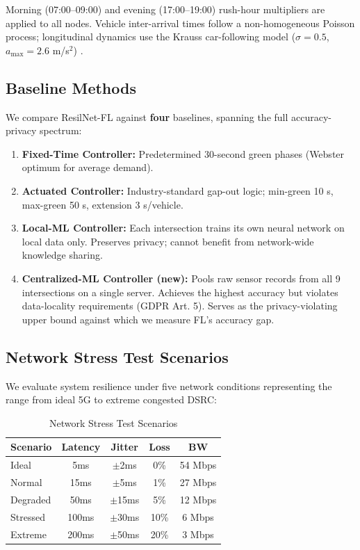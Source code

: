 \documentclass[conference]{IEEEtran}
\begin{document}
Morning (07:00--09:00) and evening (17:00--19:00) rush-hour multipliers are applied to all nodes. Vehicle inter-arrival times follow a non-homogeneous Poisson process; longitudinal dynamics use the Krauss car-following model ($\sigma = 0.5$, $a_\text{max} = 2.6$ m/s$^2$) \cite{krauss1998}.

\subsection{Baseline Methods}
We compare ResilNet-FL against \textbf{four} baselines, spanning the full accuracy-privacy spectrum:

\begin{enumerate}
    \item \textbf{Fixed-Time Controller:} Predetermined 30-second green phases (Webster optimum for average demand).

    \item \textbf{Actuated Controller:} Industry-standard gap-out logic; min-green 10 s, max-green 50 s, extension 3 s/vehicle.

    \item \textbf{Local-ML Controller:} Each intersection trains its own neural network on local data only. Preserves privacy; cannot benefit from network-wide knowledge sharing.

    \item \textbf{Centralized-ML Controller (new):} Pools raw sensor records from all 9 intersections on a single server. Achieves the highest accuracy but violates data-locality requirements (GDPR Art. 5). Serves as the privacy-violating upper bound against which we measure FL's accuracy gap.
\end{enumerate}

\subsection{Network Stress Test Scenarios}
We evaluate system resilience under five network conditions representing the range from ideal 5G to extreme congested DSRC:

\begin{table}[htbp]
\caption{Network Stress Test Scenarios}
\label{tab:network_scenarios}
\centering
\begin{tabular}{lcccc}
\toprule
\textbf{Scenario} & \textbf{Latency} & \textbf{Jitter} & \textbf{Loss} & \textbf{BW} \\
\midrule
Ideal & 5ms & $\pm$2ms & 0\% & 54 Mbps \\
Normal & 15ms & $\pm$5ms & 1\% & 27 Mbps \\
Degraded & 50ms & $\pm$15ms & 5\% & 12 Mbps \\
Stressed & 100ms & $\pm$30ms & 10\% & 6 Mbps \\
Extreme & 200ms & $\pm$50ms & 20\% & 3 Mbps \\
\bottomrule
\end{tabular}
\end{table}
\end{document}
